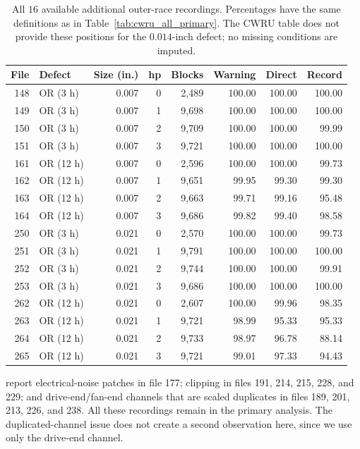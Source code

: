 \documentclass[11pt]{article}
\theoremstyle{definition}
\theoremstyle{remark}
\newcommand{\1}{\mathbf 1}
\begin{document}
\begin{table}[H]
\centering\small
\setlength{\tabcolsep}{5pt}
\begin{tabular}{rlrrrrrr}
\toprule
File & Defect & Size (in.) & hp & Blocks & Warning & Direct & Record \\
\midrule
148 & OR (3 h) & 0.007 & 0 & 2,489 & 100.00 & 100.00 & 100.00 \\
149 & OR (3 h) & 0.007 & 1 & 9,698 & 100.00 & 100.00 & 100.00 \\
150 & OR (3 h) & 0.007 & 2 & 9,709 & 100.00 & 100.00 & 99.99 \\
151 & OR (3 h) & 0.007 & 3 & 9,721 & 100.00 & 100.00 & 100.00 \\
161 & OR (12 h) & 0.007 & 0 & 2,596 & 100.00 & 100.00 & 99.73 \\
162 & OR (12 h) & 0.007 & 1 & 9,651 & 99.95 & 99.30 & 99.30 \\
163 & OR (12 h) & 0.007 & 2 & 9,663 & 99.71 & 99.16 & 95.48 \\
164 & OR (12 h) & 0.007 & 3 & 9,686 & 99.82 & 99.40 & 98.58 \\
250 & OR (3 h) & 0.021 & 0 & 2,570 & 100.00 & 100.00 & 99.73 \\
251 & OR (3 h) & 0.021 & 1 & 9,791 & 100.00 & 100.00 & 100.00 \\
252 & OR (3 h) & 0.021 & 2 & 9,744 & 100.00 & 100.00 & 99.91 \\
253 & OR (3 h) & 0.021 & 3 & 9,686 & 100.00 & 100.00 & 100.00 \\
262 & OR (12 h) & 0.021 & 0 & 2,607 & 100.00 & 99.96 & 98.35 \\
263 & OR (12 h) & 0.021 & 1 & 9,721 & 98.99 & 95.33 & 95.33 \\
264 & OR (12 h) & 0.021 & 2 & 9,733 & 98.97 & 96.78 & 88.14 \\
265 & OR (12 h) & 0.021 & 3 & 9,721 & 99.01 & 97.33 & 94.43 \\
\bottomrule
\end{tabular}
\caption{All \(16\) available additional outer-race recordings. Percentages have the same definitions as in Table~\ref{tab:cwru_all_primary}. The CWRU table does not provide these positions for the \(0.014\)-inch defect; no missing conditions are imputed.}
\end{table}

\citet[Table 3]{smithRandall2015} report electrical-noise patches in file 177; clipping in files 191, 214, 215, 228, and 229; and drive-end/fan-end channels that are scaled duplicates in files 189, 201, 213, 226, and 238. All these recordings remain in the primary analysis. The duplicated-channel issue does not create a second observation here, since we use only the drive-end channel.
\end{document}
